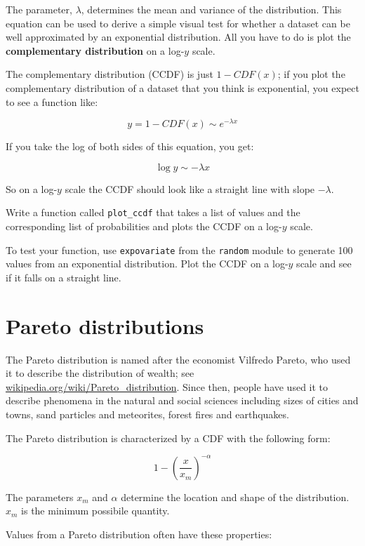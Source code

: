 \documentclass[10pt]{book}
\begin{document}
The parameter, $\lambda$, determines the mean and variance
of the distribution.  This equation can be used to derive
a simple visual test for whether a dataset can be well
approximated by an exponential distribution.  All you
have to do is plot the {\bf complementary distribution}
on a log-$y$ scale.

The complementary distribution (CCDF) is just $1 - CDF(x)$; 
if you plot the complementary distribution of a dataset
that you think is exponential, you expect to see a function
like:

\[ y = 1 - CDF(x) \sim e^{-\lambda x} \]

If you take the log of both sides of this equation, you get:

\[ \log y \sim -\lambda x \]

So on a log-$y$ scale the CCDF should look like a straight line
with slope $-\lambda$.

\begin{ex}

Write a function called \verb"plot_ccdf" that takes
a list of values and the corresponding list of probabilities
and plots the CCDF on a log-$y$ scale.

To test your function, use {\tt expovariate} from the {\tt random}
module to generate 100 values from an exponential distribution.  Plot
the CCDF on a log-$y$ scale and see if it falls on a straight line.

\end{ex}


\section{Pareto distributions}

The Pareto distribution is named after the economist Vilfredo
Pareto, who used it to describe the distribution of wealth;
see \url{wikipedia.org/wiki/Pareto_distribution}.  Since then,
people have used it to describe
phenomena in the natural and social sciences
including sizes of cities and towns, sand particles
and meteorites, forest fires and earthquakes.

The Pareto distribution is characterized by a CDF with the following
form:

\[ 1- \left( \frac{x}{x_m} \right) ^{-\alpha} \]

The parameters $x_m$ and $\alpha$ determine the location and shape of
the distribution.  $x_m$ is the minimum possibile quantity.

Values from a Pareto distribution often have these properties:
\end{document}
